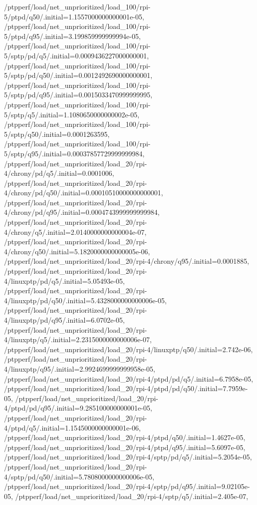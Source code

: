 {    /ptpperf/load/net_unprioritized/load_100/rpi-5/ptpd/q50/.initial=1.1557000000000001e-05,
    /ptpperf/load/net_unprioritized/load_100/rpi-5/ptpd/q95/.initial=3.199859999999994e-05,
    /ptpperf/load/net_unprioritized/load_100/rpi-5/sptp/pd/q5/.initial=0.0009436227000000001,
    /ptpperf/load/net_unprioritized/load_100/rpi-5/sptp/pd/q50/.initial=0.0012492690000000001,
    /ptpperf/load/net_unprioritized/load_100/rpi-5/sptp/pd/q95/.initial=0.0015033470999999995,
    /ptpperf/load/net_unprioritized/load_100/rpi-5/sptp/q5/.initial=1.1080650000000002e-05,
    /ptpperf/load/net_unprioritized/load_100/rpi-5/sptp/q50/.initial=0.0001263595,
    /ptpperf/load/net_unprioritized/load_100/rpi-5/sptp/q95/.initial=0.00037857729999999984,
    /ptpperf/load/net_unprioritized/load_20/rpi-4/chrony/pd/q5/.initial=0.0001006,
    /ptpperf/load/net_unprioritized/load_20/rpi-4/chrony/pd/q50/.initial=0.00010510000000000001,
    /ptpperf/load/net_unprioritized/load_20/rpi-4/chrony/pd/q95/.initial=0.0004743999999999984,
    /ptpperf/load/net_unprioritized/load_20/rpi-4/chrony/q5/.initial=2.0140000000000004e-07,
    /ptpperf/load/net_unprioritized/load_20/rpi-4/chrony/q50/.initial=5.1820000000000005e-06,
    /ptpperf/load/net_unprioritized/load_20/rpi-4/chrony/q95/.initial=0.0001885,
    /ptpperf/load/net_unprioritized/load_20/rpi-4/linuxptp/pd/q5/.initial=5.05493e-05,
    /ptpperf/load/net_unprioritized/load_20/rpi-4/linuxptp/pd/q50/.initial=5.4328000000000006e-05,
    /ptpperf/load/net_unprioritized/load_20/rpi-4/linuxptp/pd/q95/.initial=6.0702e-05,
    /ptpperf/load/net_unprioritized/load_20/rpi-4/linuxptp/q5/.initial=2.2315000000000006e-07,
    /ptpperf/load/net_unprioritized/load_20/rpi-4/linuxptp/q50/.initial=2.742e-06,
    /ptpperf/load/net_unprioritized/load_20/rpi-4/linuxptp/q95/.initial=2.9924699999999958e-05,
    /ptpperf/load/net_unprioritized/load_20/rpi-4/ptpd/pd/q5/.initial=6.7958e-05,
    /ptpperf/load/net_unprioritized/load_20/rpi-4/ptpd/pd/q50/.initial=7.7959e-05,
    /ptpperf/load/net_unprioritized/load_20/rpi-4/ptpd/pd/q95/.initial=9.285100000000001e-05,
    /ptpperf/load/net_unprioritized/load_20/rpi-4/ptpd/q5/.initial=1.1545000000000001e-06,
    /ptpperf/load/net_unprioritized/load_20/rpi-4/ptpd/q50/.initial=1.4627e-05,
    /ptpperf/load/net_unprioritized/load_20/rpi-4/ptpd/q95/.initial=5.6097e-05,
    /ptpperf/load/net_unprioritized/load_20/rpi-4/sptp/pd/q5/.initial=5.2054e-05,
    /ptpperf/load/net_unprioritized/load_20/rpi-4/sptp/pd/q50/.initial=5.7808000000000006e-05,
    /ptpperf/load/net_unprioritized/load_20/rpi-4/sptp/pd/q95/.initial=9.02105e-05,
    /ptpperf/load/net_unprioritized/load_20/rpi-4/sptp/q5/.initial=2.405e-07,
}
